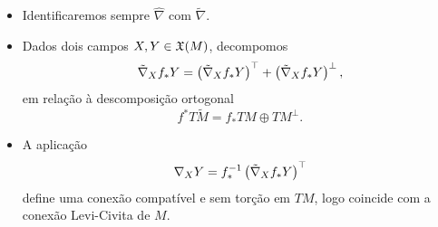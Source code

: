 \documentclass[10pt,a4paper]{beamer}
\theoremstyle{definition}
\begin{document}
\begin{frame}

	\begin{itemize}
		\item Identificaremos sempre $\hat{\nabla}$ com $\tilde{\nabla}$.
		\pause
		\item 	Dados dois campos $X,Y \in \mathfrak{X}(M)$, decompomos
		\begin{equation*}
		\tilde{\nabla}_X f_* Y = \left( \tilde{\nabla}_X f_* Y \right)^\top + \left( \tilde{\nabla}_X f_* Y \right)^\perp,
		\end{equation*}  
		em relação à descomposição ortogonal
		\begin{equation*}
		f^* T \tilde{M} = f_* TM \oplus TM^\perp.
		\end{equation*}
		\pause
		\item 	A aplicação
		\begin{equation*}
		\nabla_X Y = f_*^{-1} \left( \tilde{\nabla}_X f_* Y \right)^\top
		\end{equation*}
		define uma conexão compatível e sem torção em $TM$, logo coincide com a conexão Levi-Civita de $M$.
	\end{itemize}
	
%	
%	

\end{frame}
\end{document}
